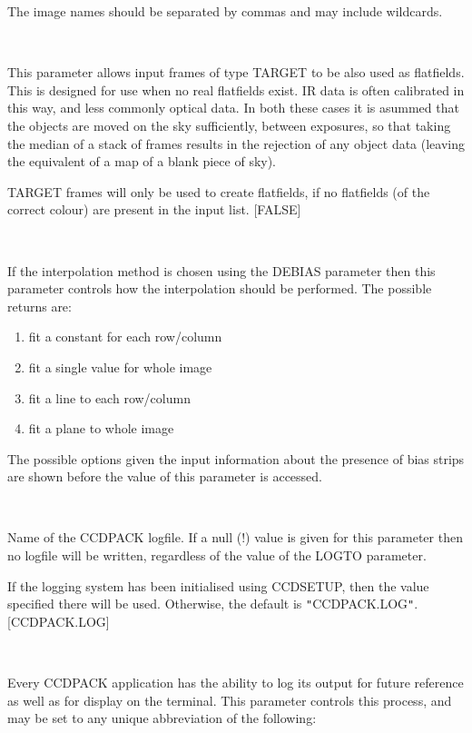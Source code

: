 \documentclass[twoside,11pt]{article}
\newcommand{\htmlref}[2]{#1}
\renewcommand{\_}{\texttt{\symbol{95}}}
\newcommand{\qt}[1]{{\tt "}#1{\tt "}}
\newcommand{\xroutine}[1]{\htmlref{{\sc #1}}{#1}}
\newcommand{\sstsubsection}[1]{ \item[{#1}] \mbox{} \\}
\newcommand{\sstitemlist}[1]{
  \mbox{} \\
  \vspace{-3.5ex}
  \begin{itemize}
     #1
  \end{itemize}
}
\newcommand{\sstsubsection}[1]{\item[{#1}]}
\newcommand{\sstitemlist}[1]{
      \begin{itemize}
         #1
      \end{itemize}
      \\
   }
\begin{document}
{{{         The image names should be separated by commas and may include
         wildcards.
      }

      \sstsubsection{
         IRFLATS = \_LOGICAL (Read)
      }{
       This parameter allows input frames of type TARGET to be also
       used as flatfields. This is designed for use when no real
       flatfields exist. IR data is often calibrated in this way, and
       less commonly optical data. In both these cases it is asummed
       that the objects are moved on the sky sufficiently, between
       exposures, so that taking the median of a stack of frames
       results in the rejection of any object data (leaving the
       equivalent of a map of a blank piece of sky).

       TARGET frames will only be used to create flatfields, if no
       flatfields (of the correct colour) are present in the input list.
       [FALSE]
      }

      \sstsubsection{
         INTERP = \_INTEGER (Read)
      }{
         If the interpolation method is chosen using the DEBIAS parameter
         then this parameter controls how the interpolation should be
         performed. The possible returns are:
         \begin{enumerate}
            \item fit a constant for each row/column
            \item fit a single value for whole image
            \item fit a line to each row/column
            \item fit a plane to whole image
         \end{enumerate}
         The possible options given the input information about the
         presence of bias strips are shown before the value of this
         parameter is accessed.
      }
      \sstsubsection{
         LOGFILE = FILENAME (Read)
      }{
         Name of the CCDPACK logfile.  If a null (!) value is given for
         this parameter then no logfile will be written, regardless of
         the value of the LOGTO parameter.

         If the logging system has been initialised using \xroutine{CCDSETUP},
         then the value specified there will be used. Otherwise, the
         default is \qt{CCDPACK.LOG}.
         [CCDPACK.LOG]
      }
      \sstsubsection{
         LOGTO = LITERAL (Read)
      }{
         Every CCDPACK application has the ability to log its output
         for future reference as well as for display on the terminal.
         This parameter controls this process, and may be set to any
         unique abbreviation of the following:
         \sstitemlist{

}}}}
\end{document}
